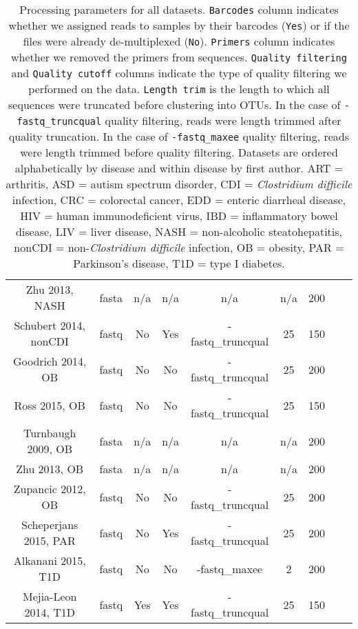 {{\begin{table}[h]
{\begin{tabular}{c c c c c c c c c}
	Zhu 2013, NASH & fasta & n/a & n/a & n/a & n/a & 200 \\
	Schubert 2014, nonCDI & fastq & No & Yes & -fastq\_truncqual & 25 & 150 \\
	Goodrich 2014, OB & fastq & No & No & -fastq\_truncqual & 25 & 200 \\
	Ross 2015, OB & fastq & No & No & -fastq\_truncqual & 25 & 150 \\
	Turnbaugh 2009, OB & fasta & n/a & n/a & n/a & n/a & 200 \\
	Zhu 2013, OB & fasta & n/a & n/a & n/a & n/a & 200 \\
	Zupancic 2012, OB & fastq & No & No & -fastq\_truncqual & 25 & 200 \\
	Scheperjans 2015, PAR & fastq & No & Yes & -fastq\_truncqual & 25 & 200 \\
	Alkanani 2015, T1D & fastq & No & No & -fastq\_maxee & 2 & 200 \\
	Mejia-Leon 2014, T1D & fastq & Yes & Yes & -fastq\_truncqual & 25 & 150 \\
	\hline
\end{tabular}}
\caption{Processing parameters for all datasets. \texttt{Barcodes} column indicates whether we assigned reads to samples by their barcodes (\texttt{Yes}) or if the files were already de-multiplexed (\texttt{No}). \texttt{Primers} column indicates whether we removed the primers from sequences. \texttt{Quality filtering} and \texttt{Quality cutoff} columns indicate the type of quality filtering we performed on the data. \texttt{Length trim} is the length to which all sequences were truncated before clustering into OTUs. In the case of \texttt{-fastq\_truncqual} quality filtering, reads were length trimmed after quality truncation. In the case of \texttt{-fastq\_maxee} quality filtering, reads were length trimmed before quality filtering. Datasets are ordered alphabetically by disease and within disease by first author. ART = arthritis, ASD = autism spectrum disorder, CDI = \textit{Clostridium difficile} infection, CRC = colorectal cancer, EDD = enteric diarrheal disease, HIV = human immunodeficient virus, IBD = inflammatory bowel disease, LIV = liver disease, NASH = non-alcoholic steatohepatitis, nonCDI = non-\textit{Clostridium difficile} infection, OB = obesity, PAR = Parkinson's disease, T1D = type I diabetes.}\label{tab:processing}
\end{table}
}

}
